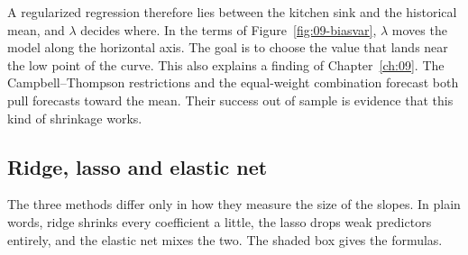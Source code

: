 A regularized regression therefore lies between the kitchen sink and the historical mean, and $\lambda$ decides where. In the terms of Figure~\ref{fig:09-biasvar}, $\lambda$ moves the model along the horizontal axis. The goal is to choose the value that lands near the low point of the curve. This also explains a finding of Chapter~\ref{ch:09}. The Campbell--Thompson restrictions and the equal-weight combination forecast both pull forecasts toward the mean. Their success out of sample is evidence that this kind of shrinkage works.

\subsection{Ridge, lasso and elastic net}

The three methods differ only in how they measure the size of the slopes. In plain words, ridge shrinks every coefficient a little, the lasso drops weak predictors entirely, and the elastic net mixes the two. The shaded box gives the formulas.

